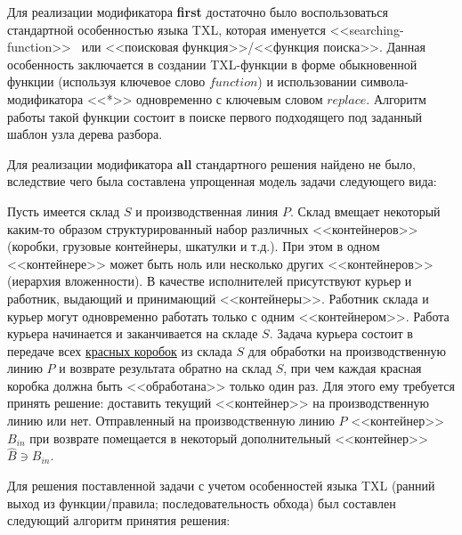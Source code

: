 Для реализации модификатора \textbf{first} достаточно было воспользоваться стандартной особенностью языка TXL, которая именуется <<searching-function>>~\cite{txl-book} или <<поисковая функция>>/<<функция поиска>>.
Данная особенность заключается в создании TXL-функции в форме обыкновенной функции (используя ключевое слово $function$) и использовании символа-модификатора <<*>> одновременно с ключевым словом $replace$.
Алгоритм работы такой функции состоит в поиске первого подходящего под заданный шаблон узла дерева разбора.

Для реализации модификатора \textbf{all} стандартного решения найдено не было, вследствие чего была составлена упрощенная модель задачи следующего вида:

Пусть имеется склад $S$ и производственная линия $P$.
Склад вмещает некоторый каким-то образом структурированный набор различных <<контейнеров>> (коробки, грузовые контейнеры, шкатулки и т.д.).
При этом в одном <<контейнере>> может быть ноль или несколько других <<контейнеров>> (иерархия вложенности).
В качестве исполнителей присутствуют курьер и работник, выдающий и принимающий <<контейнеры>>.
Работник склада и курьер могут одновременно работать только с одним <<контейнером>>.
Работа курьера начинается и заканчивается на складе $S$.
Задача курьера состоит в передаче всех \underline{красных коробок} из склада $S$ для обработки на производственную линию $P$ и возврате результата обратно на склад $S$, при чем каждая красная коробка должна быть <<обработана>> только один раз.
Для этого ему требуется принять решение: доставить текущий <<контейнер>> на производственную линию или нет.
Отправленный на производственную линию $P$ <<контейнер>> $B_{in}$ при возврате помещается в некоторый дополнительный <<контейнер>> $\hat{B} \ni B_{in}$.

Для решения поставленной задачи с учетом особенностей языка TXL (ранний выход из функции/правила; последовательность обхода) был составлен следующий алгоритм принятия решения:

